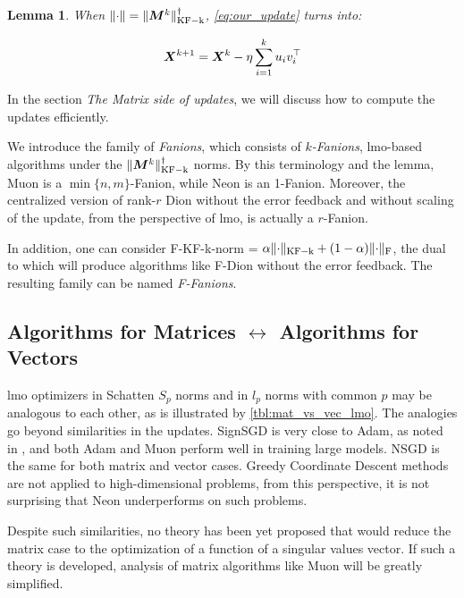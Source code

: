 \documentclass{article} %
\newtheorem{lemma}{Lemma}
\newcommand{\norm}[1]{\lVert #1\rVert}
\DeclarePairedDelimiter{\normf}{\|}{\|_\mathrm{F}}
\DeclarePairedDelimiter{\normkfk}{\|}{\|_\mathrm{KF-k}}
\begin{document}
        \begin{lemma}\label{lemma:ky_fan_update}    
            When $\norm{\cdot} = \normkfk{\mM^k}^\dagger$, \cref{eq:our_update} turns into:
    
            \begin{equation}\label{eq:ky_fan_update}
                {\bm{X}}^{k+1} = {\bm{X}}^{k} - \eta \sum_{i=1}^{k}u_i v_i^\top
            \end{equation}
        \end{lemma}
        In the section {\it The Matrix side of updates}, we will discuss how to compute the updates efficiently.

        We introduce the family of {\it Fanions}, which consists of {\it $k$-Fanions}, lmo-based algorithms under the $\normkfk{\mM^k}^\dagger$ norms. By this terminology and the lemma, Muon is a $\min\{n,m\}$-Fanion, while Neon is an 1-Fanion. Moreover, the centralized version of rank-$r$ Dion \citep{ahn2025dioncommunicationefficientoptimizerlarge} without the error feedback and without scaling of the update, from the perspective of lmo, is actually a $r$-Fanion.      
        
        In addition, one can consider F-KF-k-norm = $\alpha \normkfk{\cdot} + (1-\alpha)\normf{\cdot}$, the dual to which will produce algorithms like F-Dion without the error feedback. The resulting family can be named {\it F-Fanions}.

\subsection{Algorithms for Matrices $\leftrightarrow$ Algorithms for Vectors}

lmo optimizers in Schatten $S_p$ norms and in $l_p$ norms with common $p$ may be analogous to each other, as is illustrated by \cref{tbl:mat_vs_vec_lmo}. The analogies go beyond similarities in the updates. SignSGD is very close to Adam, as noted in \citet{bernstein2024oldoptimizernewnorm}, and both Adam and Muon perform well in training large models. NSGD is the same for both matrix and vector cases. Greedy Coordinate Descent methods are not applied to high-dimensional problems, from this perspective, it is not surprising that Neon underperforms on such problems.

Despite such similarities, no theory has been yet proposed that would reduce the matrix case to the optimization of a function of a singular values vector. If such a theory is developed, analysis of matrix algorithms like Muon will be greatly simplified.
\end{document}
